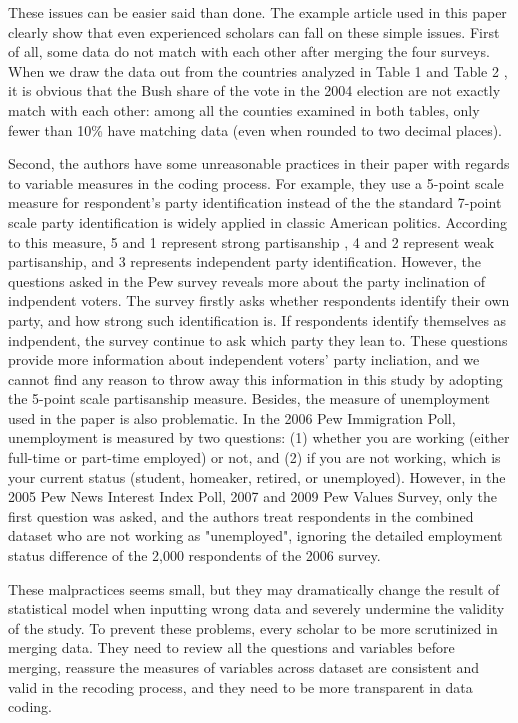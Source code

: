 These issues can be easier said than done. The example article used in this paper clearly show that even experienced scholars can fall on these simple issues. First of all, some data do not match with each other after merging the four surveys. When we draw the data out from the countries analyzed in Table 1 and Table 2 \citep{Newman2015}, it is obvious that the Bush share of the vote in the 2004 election are not exactly match with each other: among all the counties examined in both tables, only fewer than 10\% have matching data (even when rounded to two decimal places). 



Second, the authors have some unreasonable practices in their paper with regards to variable measures in the coding process. For example, they use a 5-point scale measure for respondent's party identification instead of the the standard 7-point scale party identification is widely applied in classic American politics. According to this measure, 5 and 1 represent strong partisanship , 4 and 2 represent weak partisanship, and 3 represents independent party identification. However, the questions asked in the Pew survey reveals more about the party inclination of indpendent voters. The survey firstly asks whether respondents identify their own party, and how strong such identification is. If respondents identify themselves as indpendent, the survey continue to ask which party they lean to. These questions provide more information about independent voters' party incliation, and we cannot find any reason to throw away this information in this study by adopting the 5-point scale partisanship measure. Besides, the measure of unemployment used in the paper is also problematic. In the 2006 Pew Immigration Poll, unemployment is measured by two questions: (1) whether you are working (either full-time or part-time employed) or not, and (2) if you are not working, which is your current status (student, homeaker, retired, or unemployed). However, in the 2005 Pew News Interest Index Poll, 2007 and 2009 Pew Values Survey, only the first question was asked, and the authors treat respondents in the combined dataset who are not working as "unemployed", ignoring the detailed employment status difference of the 2,000 respondents of the 2006 survey.

These malpractices seems small, but they may dramatically change the result of statistical model when inputting wrong data and severely undermine the validity of the study. To prevent these problems, every scholar to be more scrutinized in merging data. They need to review all the questions and variables before merging, reassure the measures of variables across dataset are consistent and valid in the recoding process, and they need to be more transparent in data coding. 



